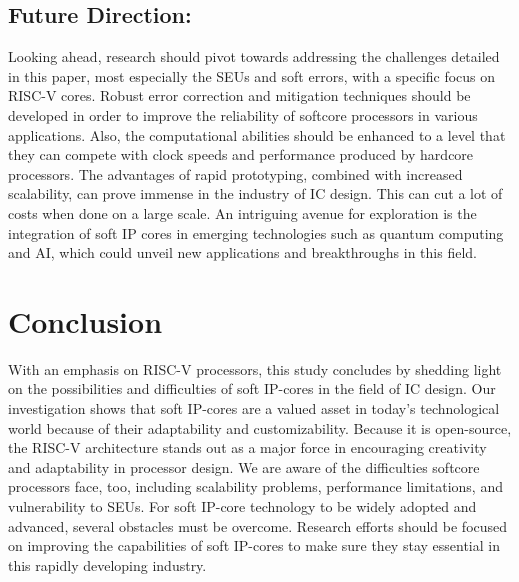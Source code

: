 \documentclass[conference]{IEEEtran}
\begin{document}
\subsection{Future Direction:} Looking ahead, research should pivot towards addressing the challenges detailed in this paper, most especially the SEUs and soft errors, with a specific focus on RISC-V cores. Robust error correction and mitigation techniques should be developed in order to improve the reliability of softcore processors in various applications. Also, the computational abilities should be enhanced to a level that they can compete with clock speeds and performance produced by hardcore processors. The advantages of rapid prototyping, combined with increased scalability, can prove immense in the industry of IC design. This can cut a lot of costs when done on a large scale. An intriguing avenue for exploration is the integration of soft IP cores in emerging technologies such as quantum computing and AI, which could unveil new applications and breakthroughs in this field.
\newpage


\section{Conclusion}
With an emphasis on RISC-V processors, this study concludes by shedding light on the possibilities and difficulties of soft IP-cores in the field of IC design. Our investigation shows that soft IP-cores are a valued asset in today's technological world because of their adaptability and customizability. Because it is open-source, the RISC-V architecture stands out as a major force in encouraging creativity and adaptability in processor design. We are aware of the difficulties softcore processors face, too, including scalability problems, performance limitations, and vulnerability to SEUs. For soft IP-core technology to be widely adopted and advanced, several obstacles must be overcome.  Research efforts should be focused on improving the capabilities of soft IP-cores to make sure they stay essential in this rapidly developing industry.
\end{document}
